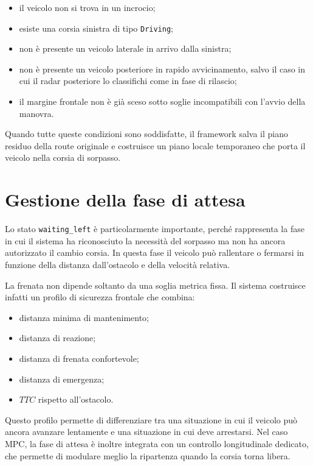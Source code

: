 \begin{itemize}
    \item il veicolo non si trova in un incrocio;
    \item esiste una corsia sinistra di tipo \texttt{Driving};
    \item non è presente un veicolo laterale in arrivo dalla sinistra;
    \item non è presente un veicolo posteriore in rapido avvicinamento, salvo il caso in cui il radar posteriore lo classifichi come in fase di rilascio;
    \item il margine frontale non è già sceso sotto soglie incompatibili con l'avvio della manovra.
\end{itemize}

Quando tutte queste condizioni sono soddisfatte, il framework salva il piano residuo della route originale e costruisce un piano locale temporaneo che porta il veicolo nella corsia di sorpasso.

\section{Gestione della fase di attesa}

Lo stato \texttt{waiting\_left} è particolarmente importante, perché rappresenta la fase in cui il sistema ha riconosciuto la necessità del sorpasso ma non ha ancora autorizzato il cambio corsia. In questa fase il veicolo può rallentare o fermarsi in funzione della distanza dall'ostacolo e della velocità relativa.

La frenata non dipende soltanto da una soglia metrica fissa. Il sistema costruisce infatti un profilo di sicurezza frontale che combina:

\begin{itemize}
    \item distanza minima di mantenimento;
    \item distanza di reazione;
    \item distanza di frenata confortevole;
    \item distanza di emergenza;
    \item \(TTC\) rispetto all'ostacolo.
\end{itemize}

Questo profilo permette di differenziare tra una situazione in cui il veicolo può ancora avanzare lentamente e una situazione in cui deve arrestarsi. Nel caso MPC, la fase di attesa è inoltre integrata con un controllo longitudinale dedicato, che permette di modulare meglio la ripartenza quando la corsia torna libera.

